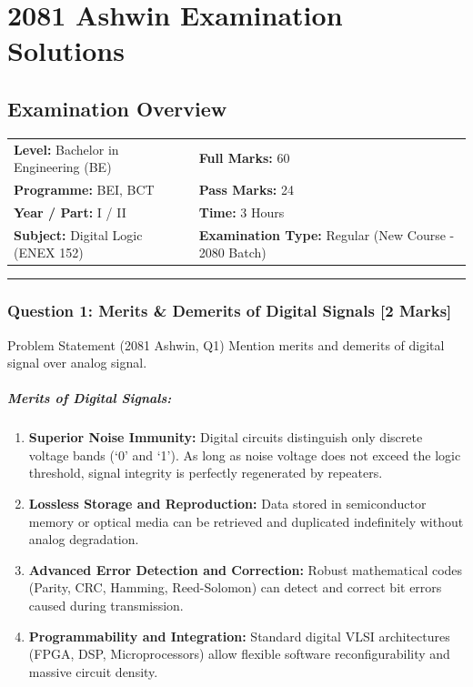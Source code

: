 \documentclass[11pt,a4paper,oneside]{book}
\begin{document}
\chapter{2081 Ashwin Examination Solutions}

\section*{Examination Overview}
\begin{tabular}{@{}ll@{}}
\textbf{Level:} Bachelor in Engineering (BE) & \textbf{Full Marks:} 60 \\
\textbf{Programme:} BEI, BCT & \textbf{Pass Marks:} 24 \\
\textbf{Year / Part:} I / II & \textbf{Time:} 3 Hours \\
\textbf{Subject:} Digital Logic (ENEX 152) & \textbf{Examination Type:} Regular (New Course - 2080 Batch) \\
\end{tabular}

\vspace{0.6cm}
\hrule
\vspace{0.6cm}

\subsection{Question 1: Merits \& Demerits of Digital Signals [2 Marks]}
\begin{questionbox}{Problem Statement (2081 Ashwin, Q1)}
Mention merits and demerits of digital signal over analog signal.
\end{questionbox}

\paragraph{Merits of Digital Signals:}
\begin{enumerate}
  \item \textbf{Superior Noise Immunity:} Digital circuits distinguish only discrete voltage bands (`0' and `1'). As long as noise voltage does not exceed the logic threshold, signal integrity is perfectly regenerated by repeaters.
  \item \textbf{Lossless Storage and Reproduction:} Data stored in semiconductor memory or optical media can be retrieved and duplicated indefinitely without analog degradation.
  \item \textbf{Advanced Error Detection and Correction:} Robust mathematical codes (Parity, CRC, Hamming, Reed-Solomon) can detect and correct bit errors caused during transmission.
  \item \textbf{Programmability and Integration:} Standard digital VLSI architectures (FPGA, DSP, Microprocessors) allow flexible software reconfigurability and massive circuit density.
\end{enumerate}
\end{document}

